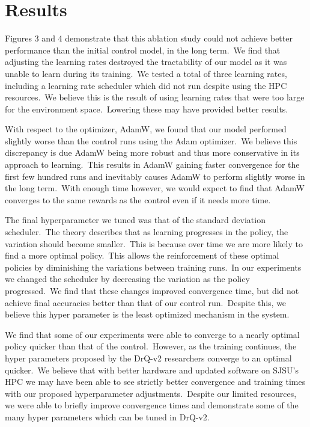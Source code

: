 \documentclass[conference]{./IEEEtran/IEEEtran} %
\begin{document}
    \section{Results}\label{sec:results}

    Figures 3 and 4 demonstrate that this ablation study could not achieve better performance than the initial control model, in
    the long term.\ We find that adjusting the learning rates destroyed the tractability of our model as it was unable to learn
    during its training.\ We tested a total of three learning rates, including a learning rate scheduler which did not run despite
    using the HPC resources.\ We believe this is the result of using learning rates that were too large for the environment space.\
    Lowering these may have provided better results.\

    With respect to the optimizer, AdamW, we found that our model performed slightly worse than the control runs using the Adam
    optimizer.\ We believe this discrepancy is due AdamW being more robust and thus more conservative in its approach to learning.\
    This results in AdamW gaining faster convergence for the first few hundred runs and inevitably causes AdamW to perform
    slightly worse in the long term.\ With enough time however, we would expect to find that AdamW converges to the same rewards
    as the control even if it needs more time.\

    The final hyperparameter we tuned was that of the standard deviation scheduler.\ The theory describes that as learning
    progresses in the policy, the variation should become smaller.\ This is because over time we are more likely to find a more
    optimal policy.\ This allows the reinforcement of these optimal policies by diminishing the variations between training runs.\
    In our experiments we changed the scheduler by decreasing the variation as the policy progressed.\  We find that these changes
    improved convergence time, but did not achieve final accuracies better than that of our control run.\ Despite this, we
    believe this hyper parameter is the least optimized mechanism in the system.\

    We find that some of our experiments were able to converge to a nearly optimal policy quicker than that of the
    control.\ However, as the training continues, the hyper parameters proposed by the DrQ-v2 researchers converge to an optimal
    quicker.\ We believe that with better hardware and updated software on SJSU's HPC we may have been able to see strictly better
    convergence and training times with our proposed hyperparameter adjustments.\ Despite our limited resources, we were able to
    briefly improve convergence times and demonstrate some of the many hyper parameters which can be tuned in DrQ-v2.\
\end{document}
